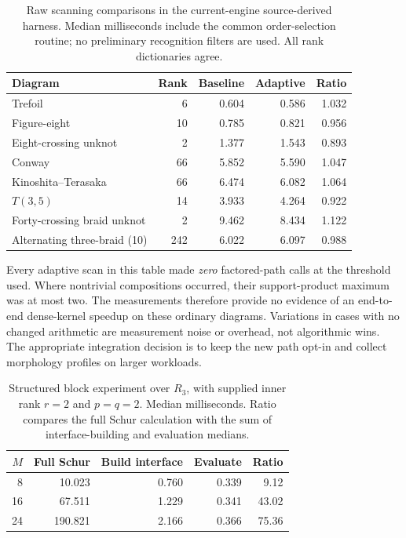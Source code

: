 \documentclass[11pt]{article}
\theoremstyle{definition}\newtheorem{definition}[theorem]{Definition}
\theoremstyle{remark}\newtheorem{remark}[theorem]{Remark}
\begin{document}
\begin{table}[htbp]
\centering\small
\begin{tabular}{lrrrr}
\toprule
Diagram & Rank & Baseline & Adaptive & Ratio \\
\midrule
Trefoil & 6 & 0.604 & 0.586 & 1.032 \\
Figure-eight & 10 & 0.785 & 0.821 & 0.956 \\
Eight-crossing unknot & 2 & 1.377 & 1.543 & 0.893 \\
Conway & 66 & 5.852 & 5.590 & 1.047 \\
Kinoshita--Terasaka & 66 & 6.474 & 6.082 & 1.064 \\
$T(3,5)$ & 14 & 3.933 & 4.264 & 0.922 \\
Forty-crossing braid unknot & 2 & 9.462 & 8.434 & 1.122 \\
Alternating three-braid (10) & 242 & 6.022 & 6.097 & 0.988 \\
\bottomrule
\end{tabular}
\caption{Raw scanning comparisons in the current-engine source-derived harness. Median milliseconds include the common order-selection routine; no preliminary recognition filters are used. All rank dictionaries agree.}
\label{tab:scans}
\end{table}

Every adaptive scan in this table made \emph{zero} factored-path calls at the threshold used. Where nontrivial compositions occurred, their support-product maximum was at most two. The measurements therefore provide no evidence of an end-to-end dense-kernel speedup on these ordinary diagrams. Variations in cases with no changed arithmetic are measurement noise or overhead, not algorithmic wins. The appropriate integration decision is to keep the new path opt-in and collect morphology profiles on larger workloads.

\begin{table}[htbp]
\centering\small
\begin{tabular}{rrrrr}
\toprule
$M$ & Full Schur & Build interface & Evaluate & Ratio \\
\midrule
8 & 10.023 & 0.760 & 0.339 & 9.12 \\
16 & 67.511 & 1.229 & 0.341 & 43.02 \\
24 & 190.821 & 2.166 & 0.366 & 75.36 \\
\bottomrule
\end{tabular}
\caption{Structured block experiment over $R_3$, with supplied inner rank $r=2$ and $p=q=2$. Median milliseconds. Ratio compares the full Schur calculation with the sum of interface-building and evaluation medians.}
\label{tab:interface}
\end{table}
\end{document}
